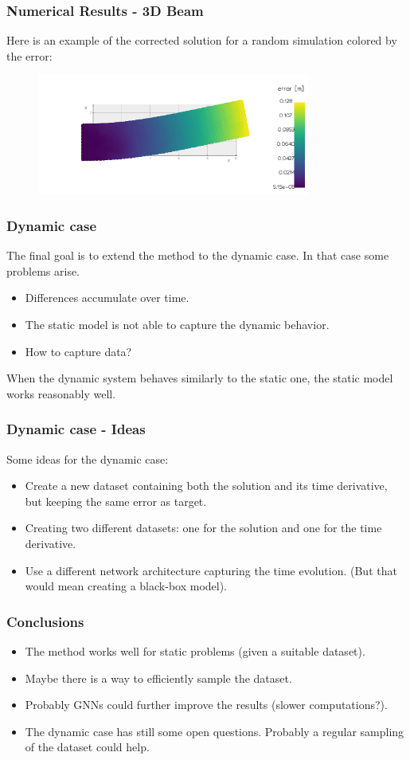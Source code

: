 \documentclass{beamer}
\begin{document}
\begin{frame}
    \frametitle{Numerical Results - 3D Beam}
    Here is an example of the corrected solution for a random simulation colored by the error:
    \begin{figure}
        \centering
        \includegraphics[width=0.8\textwidth]{Images/output_3D_beam.png}
    \end{figure}
\end{frame}

\begin{frame}
    \frametitle{Dynamic case}
    The final goal is to extend the method to the dynamic case. In that case some problems arise.
    \begin{itemize}
        \item Differences accumulate over time.
        \item The static model is not able to capture the dynamic behavior.
        \item How to capture data?
    \end{itemize}
    When the dynamic system behaves similarly to the static one, the static model works reasonably well.
\end{frame}

\begin{frame}
    \frametitle{Dynamic case - Ideas}
    Some ideas for the dynamic case:
    \begin{itemize}
        \item Create a new dataset containing both the solution and its time derivative, but keeping the same error as target.
        \item Creating two different datasets: one for the solution and one for the time derivative.
        \item Use a different network architecture capturing the time evolution. (But that would mean creating a black-box model).
    \end{itemize}
\end{frame}

\begin{frame}
    \frametitle{Conclusions}
    \begin{itemize}
        \item The method works well for static problems (given a suitable dataset).
        \item Maybe there is a way to efficiently sample the dataset.
        \item Probably GNNs could further improve the results (slower computations?).
        \item The dynamic case has still some open questions. Probably a regular sampling of the dataset could help.
    \end{itemize}
\end{frame}
\end{document}
